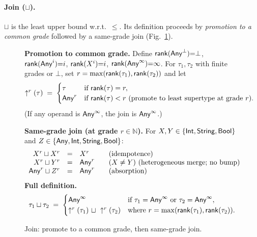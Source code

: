 \paragraph{Join (\texorpdfstring{$\sqcup$}{sqcup}).}
$\sqcup$ is the least upper bound w.r.t.\ $\le$.
Its definition proceeds by \emph{promotion to a common grade} followed by a same-grade join (Fig.~\ref{fig:join}).

\begin{figure}[t]
\centering
\textbf{Promotion to common grade.}
Define $\mathsf{rank}(\mathsf{Any}^{\bot}){=}\bot$, $\mathsf{rank}(\mathsf{Any}^{i}){=}i$, $\mathsf{rank}(X^{i}){=}i$, $\mathsf{rank}(\mathsf{Any}^{\infty}){=}\infty$.
For $\tau_1,\tau_2$ with finite grades or $\bot$, set $r=\max(\mathsf{rank}(\tau_1),\mathsf{rank}(\tau_2))$ and let
\[
\uparrow^{r}(\tau) \;=\;
\begin{cases}
\tau & \text{if } \mathsf{rank}(\tau)=r,\\
\mathsf{Any}^{r} & \text{if } \mathsf{rank}(\tau)<r\text{ (promote to least supertype at grade $r$).}
\end{cases}
\]
(If any operand is $\mathsf{Any}^{\infty}$, the join is $\mathsf{Any}^{\infty}$.)

\medskip
\textbf{Same-grade join (at grade $r\in\mathbb{N}$).}
For $X,Y\in\{\mathsf{Int},\mathsf{String},\mathsf{Bool}\}$ and $Z\in\{\mathsf{Any},\mathsf{Int},\mathsf{String},\mathsf{Bool}\}$:
\[
\begin{array}{r@{\quad=\quad}l@{\qquad}l}
X^{r} \sqcup X^{r} & X^{r} & \text{(idempotence)}\\
X^{r} \sqcup Y^{r} & \Any^{r} & (X\neq Y)\ \text{(heterogeneous merge; no bump)}\\
\Any^{r} \sqcup Z^{r} & \Any^{r} & \text{(absorption)}\\
\end{array}
\]
\medskip
\textbf{Full definition.}
\[
\tau_1 \sqcup \tau_2 \;=\;
\begin{cases}
\mathsf{Any}^{\infty} & \text{if }\tau_1=\mathsf{Any}^{\infty}\text{ or }\tau_2=\mathsf{Any}^{\infty},\\
\uparrow^{r}(\tau_1)\ \sqcup\ \uparrow^{r}(\tau_2) & \text{where } r=\max(\mathsf{rank}(\tau_1),\mathsf{rank}(\tau_2)).
\end{cases}
\]
\vspace{-1mm}
\caption{Join: promote to a common grade, then same-grade join.}
\label{fig:join}
\end{figure}

